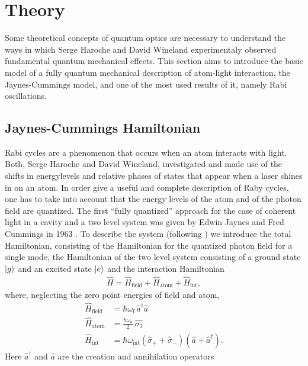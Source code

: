 \section{Theory}
Some theoretical concepts of quantum optics are necessary to understand the ways
in which Serge Haroche and David Wineland experimentaly observed fundamental
quantum mechanical effects. This section aims to introduce the basic model of a
fully quantum mechanical description of atom-light interaction, the Jaynes-Cummings model, and
one of the most used results of it, namely Rabi oscillations.

\subsection{Jaynes-Cummings Hamiltonian}
Rabi cycles are a phenomenon that occurs when an atom interacts with light.
Both, Serge Haroche and David Wineland, investigated and made use of the
shifts in energylevels and relative phases of states that appear when a laser
shines in on an atom.  In
order give a useful and complete description of Raby cycles, one has to take into
account that the energy levels of the atom and of the photon field are
quantized. The first ``fully quantized'' approach for the case of coherent light
in a cavity and a two level system was given by Edwin Jaynes and Fred Cummings
in 1963 \cite{jaynes1963comparison}. To describe the system (following
\cite{gerry2005introductory}) 
we introduce the total Hamiltonian, consisting of the Hamiltonian for the 
 quantized photon field for a single mode, the Hamiltonian of the two level
 system consisting of a ground state $\ket{g}$ and an excited state $\ket{e}$ and the
 interaction Hamiltonian
\begin{align}
  \label{eq:JCM_H_tot}
  {\hat {H}}={\hat {H}}_{{{\text{field}}}}+{\hat {H}}_{{{\text{atom}}}}+{\hat
  {H}}_{{{\text{int}}}},
\end{align}
where, neglecting the zero point energies of field and atom,
\begin{align}
  \label{eq:JCM_H_field}
  \hat{H}_{\text{field}} &= \hbar \omega_{\text{f}}\, \hat{a}^\dagger
   \hat{a}\\
  \label{eq:JCM_H_atom}
  \hat{H}_{\text{atom}} &= \frac{\hbar \omega_a}{2} \, \hat{\sigma_3} \\
  \label{eq:JCM_H_int}
  \hat{H}_{\text{int}} &= \hbar \omega_{\text{int}} \left( \hat{\sigma}_+ +
\hat{\sigma}_-\right)\left(\hat{a} + \hat{a}^\dagger\right).
\end{align}
Here $\hat{a}^\dagger$ and $\hat{a}$ are the creation and annihilation operators
